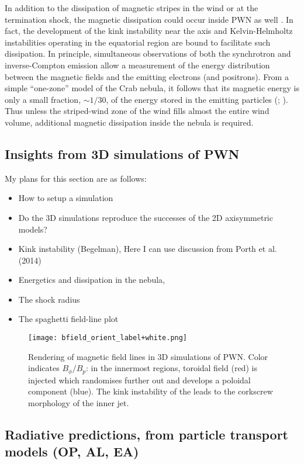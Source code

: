 In addition to the dissipation of magnetic stripes in the wind or at the termination shock, the magnetic dissipation could occur inside PWN as well \citep{lyutikov2010c,komissarov2013}. In fact, the development of the kink instability near the axis and Kelvin-Helmholtz instabilities operating in the equatorial region \citep{camus2009} are bound to facilitate such dissipation. In principle, simultaneous observations of both the synchrotron and inverse-Compton emission allow a measurement of the energy distribution between the magnetic fields and the emitting electrons (and positrons). From a simple ``one-zone'' model of the Crab nebula, it follows that its magnetic energy is only a small fraction, $\sim1/30$, of the energy stored in the emitting particles (\cite{MeyerHorns2010}; \cite{komissarov2013}). Thus unless the striped-wind zone of the wind fills almost the entire wind volume, additional magnetic dissipation inside the nebula is required.  


\subsection{Insights from 3D simulations of PWN}

My plans for this section are as follows:
\begin{itemize}
\item
How to setup a simulation
\item
Do the 3D simulations reproduce the successes of the 2D axisymmetric models?
\item
Kink instability (Begelman), Here I can use discussion from Porth et al. (2014)
\item
Energetics and dissipation in the nebula, 
\item
The shock radius
\item
The spaghetti field-line plot
\end{itemize}

\begin{figure}[htbp]
\begin{center}
\texttt{[image: bfield\_orient\_label+white.png]}
\caption{Rendering of magnetic field lines in 3D simulations of PWN.  Color indicates $B_\phi/B_{p}$: in the innermost regions, toroidal field (red) is injected which randomises further out and develops a poloidal component (blue).  The kink instability of the leads to the corkscrew morphology of the inner jet.  }
\label{fig:spaghetti}
\end{center}
\end{figure}


\subsection{Radiative predictions, from particle transport models      (OP, AL, EA)}